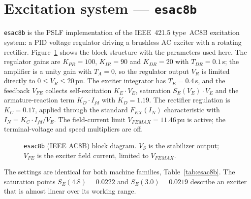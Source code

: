 \section{Excitation system --- \texttt{esac8b}}
\label{sec:esac8b}

\texttt{esac8b} is the PSLF implementation of the IEEE~421.5 type~AC8B excitation
system: a PID voltage regulator driving a brushless AC exciter with a rotating
rectifier. Figure~\ref{fig:esac8b} shows the block structure with the parameters used
here. The regulator gains are $K_{PR} = 100$, $K_{IR} = 90$ and $K_{DR} = 20$ with
$T_{DR} = 0.1$\,s; the amplifier is a unity gain with $T_A = 0$, so the regulator
output $V_R$ is limited directly to $0 \leq V_R \leq 20$\,pu. The exciter integrator
has $T_E = 0.4$\,s, and the feedback $V_{FE}$ collects self-excitation $K_E \cdot V_E$,
saturation $S_E(V_E) \cdot V_E$ and the armature-reaction term $K_D \cdot I_{fd}$
with $K_D = 1.19$. The rectifier regulation is $K_C = 0.17$, applied through the
standard $F_{EX}(I_N)$ characteristic with $I_N = K_C \cdot I_{fd} / V_E$. The
field-current limit $V_{FEMAX} = 11.46$\,pu is active; the terminal-voltage and speed
multipliers are off.

\begin{figure}[!ht]
\centering
\resizebox{\linewidth}{!}{}
\caption{\texttt{esac8b} (IEEE AC8B) block diagram. $V_S$ is the stabilizer output; $V_{FE}$ is the exciter field current, limited to $V_{FEMAX}$.}
\label{fig:esac8b}
\end{figure}

The settings are identical for both machine families, Table~\ref{tab:esac8b}. The
saturation points $S_E(4.8) = 0.0222$ and $S_E(3.0) = 0.0219$ describe an exciter
that is almost linear over its working range.

\begin{table}[!ht]
\centering

\caption{\texttt{esac8b} parameters (common to all nine units).}
\label{tab:esac8b}
\end{table}
